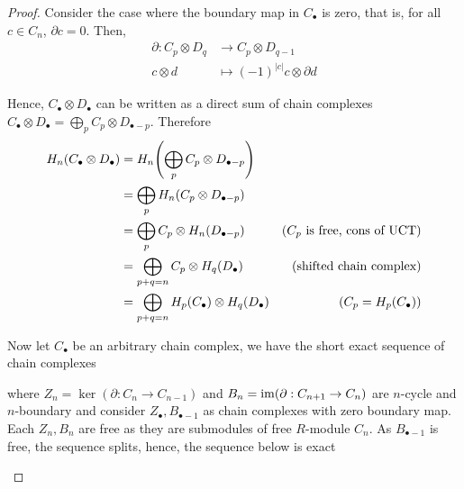 \documentclass{article}
\begin{document}
\begin{proof}
    Consider the case where the boundary map in $C_\bullet$ is zero, that is, for all $c \in C_n$, $\partial c = 0$. Then, 
    \begin{align*}
        \partial:   C_p \otimes D_q &\to C_p \otimes D_{q-1} \\
                    c \otimes d &\mapsto (-1)^{|c|} c \otimes \partial d
    \end{align*}
    
    Hence, $C_\bullet \otimes D_\bullet$ can be written as a direct sum of chain complexes $C_\bullet \otimes D_\bullet = \bigoplus_p C_p \otimes D_{\bullet-p}$. Therefore
    \begin{align*}
        H_n(C_\bullet \otimes D_\bullet) 
        &= H_n\tuple*{\bigoplus_p C_p \otimes D_{\bullet-p}} \\
        &= \bigoplus_p H_n(C_p \otimes D_{\bullet-p}) \\
        &= \bigoplus_p C_p \otimes H_n(D_{\bullet - p}) &\text{($C_p$ is free, cons of UCT)}\\
        &= \bigoplus_{p + q = n} C_p \otimes H_q(D_\bullet)&\text{(shifted chain complex)}\\
        &= \bigoplus_{p + q = n} H_p(C_\bullet) \otimes H_q(D_\bullet) &\text{($C_p = H_p(C_\bullet)$)}
    \end{align*}

    Now let $C_\bullet$ be an arbitrary chain complex, we have the short exact sequence of chain complexes
    \begin{center}
    \end{center}

    where $Z_n = \ker(\partial: C_n \to C_{n-1})$ and $B_n = \operatorname{im} (\partial: C_{n+1} \to C_n)$ are $n$-cycle and $n$-boundary and consider $Z_\bullet, B_{\bullet-1}$ as chain complexes with zero boundary map. Each $Z_n, B_n$ are free as they are submodules of free $R$-module $C_n$. As $B_{\bullet - 1}$ is free, the sequence splits, hence, the sequence below is exact
    \begin{center}
    \end{center}
    

\end{proof}
\end{document}
